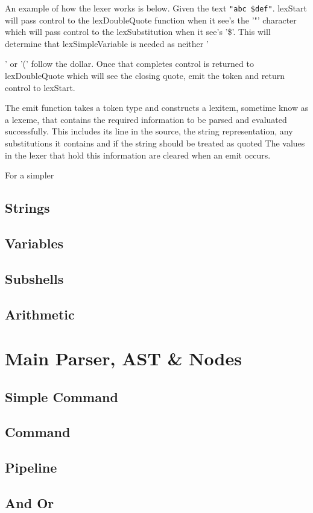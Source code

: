 An example of how the lexer works is below.
Given the text \verb!"abc $def"!.
lexStart will pass control to the lexDoubleQuote function when it see's the '"' character which will pass control to the lexSubstitution when it see's '\$'.
This will determine that lexSimpleVariable is needed as neither '{' or '(' follow the dollar.
Once that completes control is returned to lexDoubleQuote which will see the closing quote, emit the token and return control to lexStart.

The emit function takes a token type and constructs a lexitem, sometime know as a lexeme, that contains the required information to be parsed and evaluated successfully.
This includes its line in the source, the string representation, any substitutions it contains and if the string should be treated as quoted
The values in the lexer that hold this information are cleared when an emit occurs.

For a simpler 
\subsection{Strings}

\subsection{Variables}
\subsection{Subshells}
\subsection{Arithmetic}
\label{sec:main-lexer-arith}

\section{Main Parser, AST \& Nodes}

\subsection{Simple Command}
\subsection{Command}
\subsection{Pipeline}
\subsection{And Or}
}
